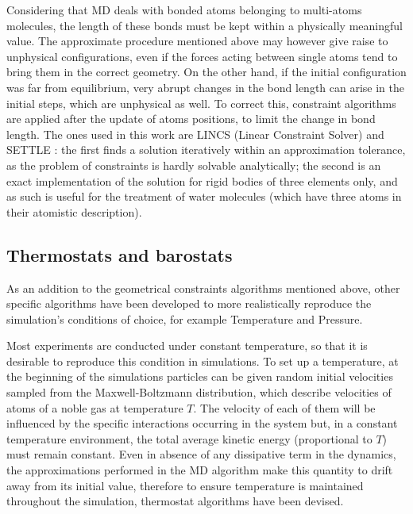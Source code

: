 Considering that MD deals with bonded atoms belonging to multi-atoms molecules, the length of these bonds must be kept within a physically meaningful value. The approximate procedure mentioned above may however give raise to unphysical configurations, even if the forces acting between single atoms tend to bring them in the correct geometry. On the other hand, if the initial configuration was far from equilibrium, very abrupt changes in the bond length can arise in the initial steps, which are unphysical as well.
%
To correct this, constraint algorithms are applied after the update of atoms positions, to limit the change in bond length. The ones used in this work are LINCS (Linear Constraint Solver) \cite{Hess1997} and SETTLE \cite{Miyamoto1992}: the first finds a solution iteratively within an approximation tolerance, as the problem of constraints is hardly solvable analytically; the second is an exact implementation of the solution for rigid bodies of three elements only, and as such is useful for the treatment of water molecules (which have three atoms in their atomistic description).

\subsection{Thermostats and barostats}
As an addition to the geometrical constraints algorithms mentioned above, other specific algorithms have been developed to more realistically reproduce the simulation's conditions of choice, for example Temperature and Pressure.

Most experiments are conducted under constant temperature, so that it is desirable to reproduce this condition in simulations.
%
To set up a temperature, at the beginning of the simulations particles can be given random initial velocities sampled from the Maxwell-Boltzmann distribution, which describe velocities of atoms of a noble gas at temperature $T$. The velocity of each of them will be influenced by the specific interactions occurring in the system but, in a constant temperature environment, the total average kinetic energy (proportional to $T$) must remain constant.
%
Even in absence of any dissipative term in the dynamics, the approximations performed in the MD algorithm make this quantity to drift away from its initial value, therefore to ensure temperature is maintained throughout the simulation, thermostat algorithms have been devised.

